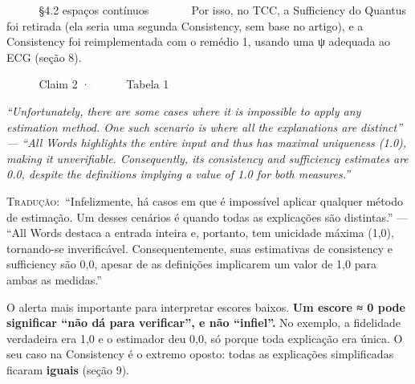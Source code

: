 \documentclass[11pt,a4paper]{article}
\newcommand{\metrictag}[2]{{\setlength{\fboxsep}{1.5pt}%
  \ifstrequal{#1}{c}{\colorbox{cC}{\textcolor{white}{\scriptsize\textbf{#2}}}}{%
  \ifstrequal{#1}{s}{\colorbox{cS}{\textcolor{white}{\scriptsize\textbf{#2}}}}{%
  \colorbox{black!60}{\textcolor{white}{\scriptsize\textbf{#2}}}}}}}
\newcommand{\pagechip}[1]{{\setlength{\fboxsep}{1.5pt}\colorbox{cAcc}{\textcolor{white}{\scriptsize\texttt{#1}}}}}
\newenvironment{origquote}{\par\itshape\small}{\par}
\newenvironment{tradquote}{\par\small\textsc{Tradução:}\ }{\par}
\newcommand{\explab}[1]{\par\smallskip{\small\color{cAcc}\textbf{\MakeUppercase{#1}}}\par}
\begin{document}
\begin{citacard}{\pagechip{p. 11} §4.2 espaços contínuos \metrictag{cs}{C + S}}
Por isso, no TCC, a Sufficiency do Quantus foi retirada (ela seria uma segunda Consistency, sem base no artigo), e a Consistency foi reimplementada com o remédio 1, usando uma ψ adequada ao ECG (seção 8).
\end{citacard}

\begin{citacard}{\pagechip{p. 11} Claim 2 · \pagechip{p. 12} Tabela 1 \metrictag{cs}{C + S}}
\begin{origquote}“Unfortunately, there are some cases where it is impossible to apply any estimation method. One such scenario is where all the explanations are distinct” — “All Words highlights the entire input and thus has maximal uniqueness (1.0), making it unverifiable. Consequently, its consistency and sufficiency estimates are 0.0, despite the definitions implying a value of 1.0 for both measures.”\end{origquote}
\begin{tradquote}“Infelizmente, há casos em que é impossível aplicar qualquer método de estimação. Um desses cenários é quando todas as explicações são distintas.” — “All Words destaca a entrada inteira e, portanto, tem unicidade máxima (1,0), tornando-se inverificável. Consequentemente, suas estimativas de consistency e sufficiency são 0,0, apesar de as definições implicarem um valor de 1,0 para ambas as medidas.”\end{tradquote}
\explab{Explicação}
O alerta mais importante para interpretar escores baixos. \textbf{Um escore ≈ 0 pode significar “não dá para verificar”, e não “infiel”.} No exemplo, a fidelidade verdadeira era 1,0 e o estimador deu 0,0, só porque toda explicação era única. O seu caso na Consistency é o extremo oposto: todas as explicações simplificadas ficaram \textbf{iguais} (seção 9).
\end{citacard}
\end{document}
